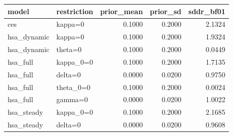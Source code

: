 \begin{tabular}{llrrr}
\toprule
model & restriction & prior\_mean & prior\_sd & sddr\_bf01 \\
\midrule
ces & kappa=0 & 0.1000 & 0.2000 & 2.1324 \\
hsa\_dynamic & kappa=0 & 0.1000 & 0.2000 & 1.9324 \\
hsa\_dynamic & theta=0 & 0.1000 & 0.2000 & 0.0449 \\
hsa\_full & kappa\_0=0 & 0.1000 & 0.2000 & 1.7135 \\
hsa\_full & delta=0 & 0.0000 & 0.0200 & 0.9750 \\
hsa\_full & theta\_0=0 & 0.1000 & 0.2000 & 0.0024 \\
hsa\_full & gamma=0 & 0.0000 & 0.0200 & 1.0022 \\
hsa\_steady & kappa\_0=0 & 0.1000 & 0.2000 & 2.1685 \\
hsa\_steady & delta=0 & 0.0000 & 0.0200 & 0.9608 \\
\bottomrule
\end{tabular}
